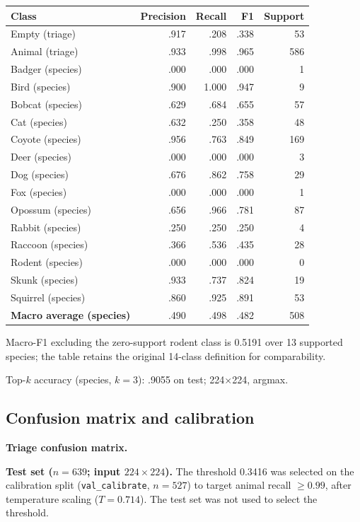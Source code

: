 \documentclass[11pt,a4paper]{article}
\begin{document}
\begin{tabularx}{\linewidth}{@{}Y r r r r@{}}
\toprule
Class & Precision & Recall & F1 & Support \\
\midrule
Empty (triage) & .917 & .208 & .338 & 53 \\
Animal (triage) & .933 & .998 & .965 & 586 \\
\midrule
Badger (species) & .000 & .000 & .000 & 1 \\
Bird (species) & .900 & 1.000 & .947 & 9 \\
Bobcat (species) & .629 & .684 & .655 & 57 \\
Cat (species) & .632 & .250 & .358 & 48 \\
Coyote (species) & .956 & .763 & .849 & 169 \\
Deer (species) & .000 & .000 & .000 & 3 \\
Dog (species) & .676 & .862 & .758 & 29 \\
Fox (species) & .000 & .000 & .000 & 1 \\
Opossum (species) & .656 & .966 & .781 & 87 \\
Rabbit (species) & .250 & .250 & .250 & 4 \\
Raccoon (species) & .366 & .536 & .435 & 28 \\
Rodent (species) & .000 & .000 & .000 & 0 \\
Skunk (species) & .933 & .737 & .824 & 19 \\
Squirrel (species) & .860 & .925 & .891 & 53 \\
\midrule
\textbf{Macro average (species)} & .490 & .498 & .482 & 508 \\
\bottomrule
\end{tabularx}

\smallskip
Macro-F1 excluding the zero-support rodent class is 0.5191 over 13 supported species; the table retains the original 14-class definition for comparability.

Top-$k$ accuracy (species, $k=3$): .9055 on test; 224$\times$224, argmax.

\subsection{Confusion matrix and calibration}

\textbf{Triage confusion matrix.}\par

\textbf{Test set ($n=639$; input $224\times224$).} The threshold 0.3416 was selected on the calibration split (\texttt{val\_calibrate}, $n=527$) to target animal recall $\geq0.99$, after temperature scaling ($T=0.714$). The test set was not used to select the threshold.
\end{document}
